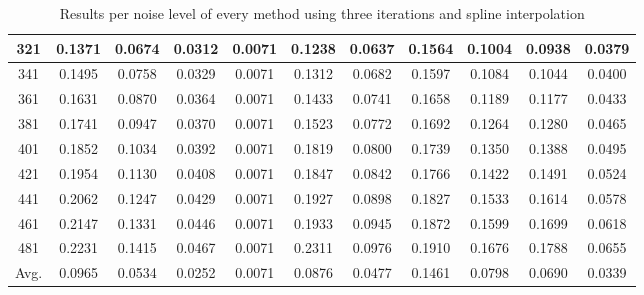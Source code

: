 \begin{table}[ht!]
\begin{tabular}{c|c|c|c|c|c|c|c|c|c|c}
321 & 0.1371 & 0.0674 & 0.0312 & 0.0071 & 0.1238 & 0.0637 & 0.1564 & 0.1004 & 0.0938 & 0.0379 \\ \hline
341 & 0.1495 & 0.0758 & 0.0329 & 0.0071 & 0.1312 & 0.0682 & 0.1597 & 0.1084 & 0.1044 & 0.0400 \\ \hline
361 & 0.1631 & 0.0870 & 0.0364 & 0.0071 & 0.1433 & 0.0741 & 0.1658 & 0.1189 & 0.1177 & 0.0433 \\ \hline
381 & 0.1741 & 0.0947 & 0.0370 & 0.0071 & 0.1523 & 0.0772 & 0.1692 & 0.1264 & 0.1280 & 0.0465 \\ \hline
401 & 0.1852 & 0.1034 & 0.0392 & 0.0071 & 0.1819 & 0.0800 & 0.1739 & 0.1350 & 0.1388 & 0.0495 \\ \hline
421 & 0.1954 & 0.1130 & 0.0408 & 0.0071 & 0.1847 & 0.0842 & 0.1766 & 0.1422 & 0.1491 & 0.0524 \\ \hline
441 & 0.2062 & 0.1247 & 0.0429 & 0.0071 & 0.1927 & 0.0898 & 0.1827 & 0.1533 & 0.1614 & 0.0578 \\ \hline
461 & 0.2147 & 0.1331 & 0.0446 & 0.0071 & 0.1933 & 0.0945 & 0.1872 & 0.1599 & 0.1699 & 0.0618 \\ \hline
481 & 0.2231 & 0.1415 & 0.0467 & 0.0071 & 0.2311 & 0.0976 & 0.1910 & 0.1676 & 0.1788 & 0.0655 \\ \hline
Avg.  & 0.0965 & 0.0534 & 0.0252 & 0.0071 & 0.0876 & 0.0477 & 0.1461 & 0.0798 & 0.0690 & 0.0339 \\ \hline
\end{tabular}
\caption{Results per noise level of every method using three iterations and spline interpolation}
\label{tab:3itSperNoise}
\end{table}


